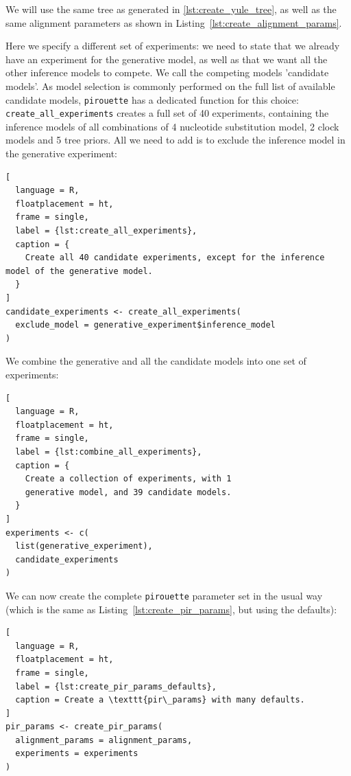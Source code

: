 We will use the same tree as generated in \ref{lst:create_yule_tree}, as well 
as the same alignment parameters as shown 
in Listing~\ref{lst:create_alignment_params}.

Here we specify a different set of experiments: we
need to state that we already have an experiment for
the generative model, as well as that we want all the other inference models 
to compete. We call the competing models 'candidate models'.
As model selection is commonly performed on the full list of available 
candidate models, \verb;pirouette; has a dedicated function 
for this choice: \verb;create_all_experiments; creates a full set 
of 40 experiments, 
containing the inference models of all combinations of 4 nucleotide substitution model, 
2 clock models and 5 tree priors. All we need to add is to exclude the 
inference model in the generative experiment:

\begin{lstlisting}[
  language = R, 
  floatplacement = ht, 
  frame = single, 
  label = {lst:create_all_experiments},
  caption = {
    Create all 40 candidate experiments, except for the inference model of the generative model.
  }
]
candidate_experiments <- create_all_experiments(
  exclude_model = generative_experiment$inference_model
)
\end{lstlisting}

We combine the generative and all the candidate models into one set of 
experiments:

\begin{lstlisting}[
  language = R, 
  floatplacement = ht, 
  frame = single, 
  label = {lst:combine_all_experiments},
  caption = {
    Create a collection of experiments, with 1
    generative model, and 39 candidate models.
  }
]
experiments <- c(
  list(generative_experiment),
  candidate_experiments
)
\end{lstlisting}

We can now create the complete \verb;pirouette; parameter set in the usual 
way (which is the same as Listing~\ref{lst:create_pir_params}, but using the 
defaults):

\begin{lstlisting}[
  language = R,
  floatplacement = ht,
  frame = single,
  label = {lst:create_pir_params_defaults},
  caption = Create a \texttt{pir\_params} with many defaults.
]
pir_params <- create_pir_params(
  alignment_params = alignment_params,
  experiments = experiments
)
\end{lstlisting}

